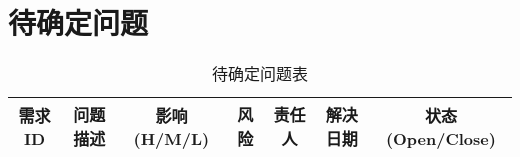\chapter{待确定问题}
    \begin{table}[htbp]
        \centering
            \caption{待确定问题表} \label{tab:tbd_problems}
            \begin{tabular}{|c|c|c|c|c|c|c|}
                \hline
                需求ID & 问题描述 & 影响(H/M/L) & 风险 & 责任人 & 解决日期 & 状态(Open/Close) \\
                \hline
            \end{tabular}
    \end{table}
